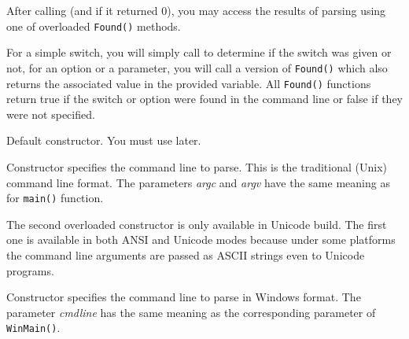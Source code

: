 \label{wxcmdlineparsergettingresults}

After calling  (and if it returned $0$),
you may access the results of parsing using one of overloaded {\tt Found()}
methods.

For a simple switch, you will simply call 
 to determine if the switch was given
or not, for an option or a parameter, you will call a version of {\tt Found()} 
which also returns the associated value in the provided variable. All 
{\tt Found()} functions return true if the switch or option were found in the
command line or false if they were not specified.



\label{wxcmdlineparserwxcmdlineparserdef}


Default constructor. You must use 
 later.


\label{wxcmdlineparserwxcmdlineparserargc}



Constructor specifies the command line to parse. This is the traditional
(Unix) command line format. The parameters {\it argc} and {\it argv} have the
same meaning as for {\tt main()} function.

The second overloaded constructor is only available in Unicode build. The
first one is available in both ANSI and Unicode modes because under some
platforms the command line arguments are passed as ASCII strings even to
Unicode programs.


\label{wxcmdlineparserwxcmdlineparserstr}


Constructor specifies the command line to parse in Windows format. The parameter 
{\it cmdline} has the same meaning as the corresponding parameter of 
{\tt WinMain()}.


